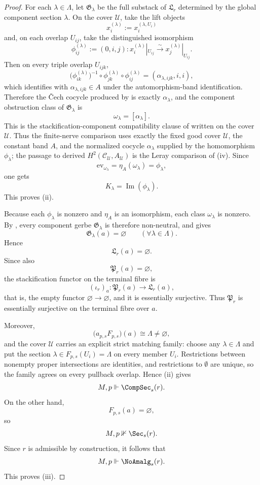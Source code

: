 \begin{proof}
For each $\lambda\in\Lambda$, let $\mathfrak G_\lambda$ be the full substack of $\mathfrak L_r$ determined by the global component section $\lambda$. On the cover $\mathcal U$, take the lift objects
\[
x_i^{(\lambda)}:=x_i^{(\lambda,U_i)}
\]
and, on each overlap $U_{ij}$, take the distinguished isomorphism
\[
\phi_{ij}^{(\lambda)}:=(0,i,j):x_i^{(\lambda)}|_{U_{ij}}\xrightarrow{\sim}x_j^{(\lambda)}|_{U_{ij}}.
\]
Then on every triple overlap $U_{ijk}$,
\[
\bigl(\phi_{ik}^{(\lambda)}\bigr)^{-1}\circ
\phi_{jk}^{(\lambda)}\circ
\phi_{ij}^{(\lambda)}
=
(\alpha_{\lambda,ijk},i,i),
\]
which identifies with $\alpha_{\lambda,ijk}\in A$ under the automorphism-band identification. Therefore the \v{C}ech cocycle produced by
is exactly $\alpha_\lambda$, and the component obstruction class of $\mathfrak G_\lambda$ is
\[
\omega_\lambda=[\alpha_\lambda].
\]
This is the stackification-component compatibility clause of  written on the cover $\mathcal U$.
Thus the finite-nerve comparison uses exactly the fixed good cover
$\mathcal U$, the constant band $A$, and the normalized cocycle
$\alpha_\lambda$ supplied by the homomorphism $\phi_\lambda$; the passage
to derived $H^2(\mathcal C_{\mathcal U},A_{\mathcal U})$ is the Leray comparison of
(iv).
Since
\[
\mathrm{ev}_{\omega_\lambda}=\eta_A(\omega_\lambda)=\phi_\lambda,
\]
one gets
\[
K_\lambda=\operatorname{Im}(\phi_\lambda).
\]
This proves \textup{(ii)}.

Because each $\phi_\lambda$ is nonzero and $\eta_A$ is an isomorphism, each class $\omega_\lambda$ is nonzero. By
, every component
gerbe $\mathfrak G_\lambda$ is therefore non-neutral, and
 gives
\[
\mathfrak G_\lambda(a)=\varnothing
\qquad
(\forall \lambda\in\Lambda).
\]
Hence
\[
\mathfrak L_r(a)=\varnothing.
\]
Since also
\[
\mathfrak P_r(a)=\varnothing,
\]
the stackification functor on the terminal fibre is
\[
(\iota_r)_a:\mathfrak P_r(a)\to \mathfrak L_r(a),
\]
that is, the empty functor $\varnothing\to\varnothing$, and it is essentially surjective. Thus $\mathfrak P_r$ is essentially surjective on the terminal fibre over $a$.

Moreover,
\[
\bigl(a_{p,s}F_{p,s}\bigr)(a)\cong \Lambda\neq\varnothing,
\]
and the cover $\mathcal U$ carries an explicit strict matching family:
choose any $\lambda\in\Lambda$ and put the section $\lambda\in
F_{p,s}(U_i)=\Lambda$ on every member $U_i$. Restrictions between
nonempty proper intersections are identities, and restrictions to
$\emptyset$ are unique, so the family agrees on every pullback overlap.
Hence (ii) gives
\[
M,p\Vdash \CompSec_s(r).
\]
On the other hand,
\[
F_{p,s}(a)=\varnothing,
\]
so
\[
M,p\nVdash \Sec_s(r).
\]
Since $r$ is admissible by construction, it follows that
\[
M,p\Vdash \NoAmalg_s(r).
\]
This proves \textup{(iii)}.


\end{proof}
